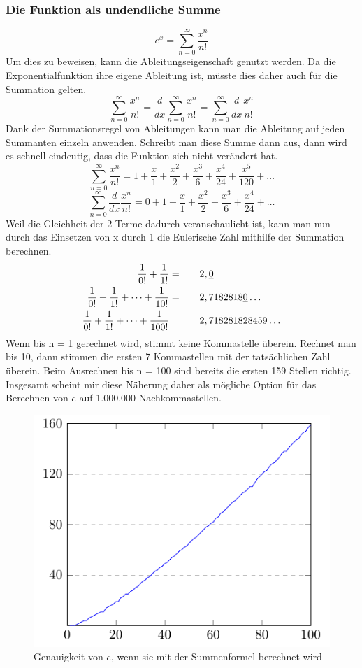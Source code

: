 \subsubsection{Die Funktion als undendliche Summe}
\[e^x = \sum_{n=0}^\infty \frac{x^n}{n!}
  \]Um dies zu beweisen, kann die Ableitungseigenschaft genutzt werden. Da die Exponentialfunktion ihre eigene Ableitung ist, müsste dies daher auch für die Summation gelten.  \[
  \sum_{n=0}^\infty \frac{x^n}{n!} = \frac{d}{dx}\sum_{n=0}^\infty \frac{x^n}{n!} = \sum_{n=0}^\infty \frac{d}{dx}\frac{x^n}{n!} 
  \] Dank der Summationsregel von Ableitungen kann man die Ableitung auf jeden Summanten einzeln anwenden. Schreibt man diese Summe dann aus, dann wird es schnell eindeutig, dass die Funktion sich nicht verändert hat. \[
  \sum_{n=0}^\infty \frac{x^n}{n!} = 1 + \frac{x}{1} + \frac{x^2}{2} + \frac{x^3}{6} + \frac{x^4}{24} + \frac{x^5}{120} + \dots
  \] \[
  \sum_{n=0}^\infty \frac{d}{dx}\frac{x^{n}}{n!} = 0 +  1 + \frac{x}{1} + \frac{x^2}{2} + \frac{x^3}{6} + \frac{x^4}{24} + \dots
\]Weil die Gleichheit der 2 Terme dadurch veranschaulicht ist, kann man nun durch das Einsetzen von x durch 1 die Eulerische Zahl mithilfe der Summation berechnen. \[
  \begin{aligned}
    \frac{1}{0!} + \frac{1}{1!} = \indent\crel{2},\underline{0}\\
    \frac{1}{0!} + \frac{1}{1!} + \dots + \frac{1}{10!} =  \indent\crel{2},7182818\underline{0}\dots\\
    \frac{1}{0!} + \frac{1}{1!} + \dots + \frac{1}{100!} = \indent\crel{2},718281828459\dots
  \end{aligned}
\] 
Wenn bis n = 1 gerechnet wird, stimmt keine Kommastelle überein. Rechnet man bis 10, dann stimmen die ersten 7 Kommastellen mit der tatsächlichen Zahl überein. Beim Ausrechnen bis n = 100 sind bereits die ersten 159 Stellen richtig. Insgesamt scheint mir diese Näherung daher als mögliche Option für das Berechnen von $e$ auf 1.000.000 Nachkommastellen.
\begin{figure}[h]
  \includegraphics{medien2/summation/summation.pdf}
  \centering
  \caption{Genauigkeit von $e$, wenn sie mit der Summenformel berechnet wird}
\end{figure}
